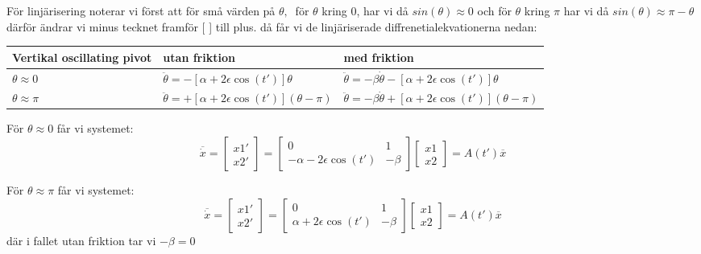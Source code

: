\documentclass{article}
\begin{document}
För linjärisering noterar vi först att för små värden på ${\theta}, \ $ för ${\theta}$ kring 0, har vi då $sin({\theta}) \approx 0$ och för ${\theta}$ kring $ {\pi}$ har vi då $ sin({\theta}) \approx {\pi}-{\theta} $ därför ändrar vi minus tecknet framför [ ] till plus. då får vi de linjäriserade diffrenetialekvationerna nedan:
\begin{center}
    \begin{tabular}{| l | l | l |}
    \hline
    Vertikal oscillating pivot & utan friktion & med friktion \\ \hline
    $ {\theta} \approx 0 $ & $ \ddot{\theta} = -[{\alpha} + 2{\epsilon}\cos(t')]{\theta} $ & $ \ddot{\theta} = -{\beta}\dot{\theta}-[{\alpha} + 2{\epsilon}\cos(t')]{\theta} $ \\ \hline
     $ {\theta} \approx {\pi} $ & $ \ddot{\theta} = +[{\alpha} + 2{\epsilon}\cos(t')]({\theta}-{\pi}) $ & $ \ddot{\theta} = -{\beta}\dot{\theta}+[{\alpha} + 2{\epsilon}\cos(t')]({\theta}-{\pi}) $ \\ \hline
    \end{tabular}
\end{center}
För ${\theta} \approx 0$ får vi systemet: \begin{equation}
\overline{\dot{x}} = \begin{bmatrix} x1' \\ x2' \end{bmatrix}  =   \begin{bmatrix} 0 & 1 \\ -{\alpha} - 2{\epsilon}\cos(t') & -{\beta} \end{bmatrix} \begin{bmatrix} x1 \\ x2 \end{bmatrix} = A(t')\overline{x} 
\end{equation}

För ${\theta} \approx {\pi}$ får vi systemet: 
\begin{equation}
\overline{\dot{x}} =  \begin{bmatrix} x1' \\ x2' \end{bmatrix} = \begin{bmatrix} 0 & 1 \\ {\alpha} + 2{\epsilon}\cos(t') & -{\beta} \end{bmatrix} \begin{bmatrix} x1 \\ x2 \end{bmatrix} = A(t')\overline{x}
\end{equation}
där i fallet utan friktion tar vi $-{\beta} = 0$
\end{document}
